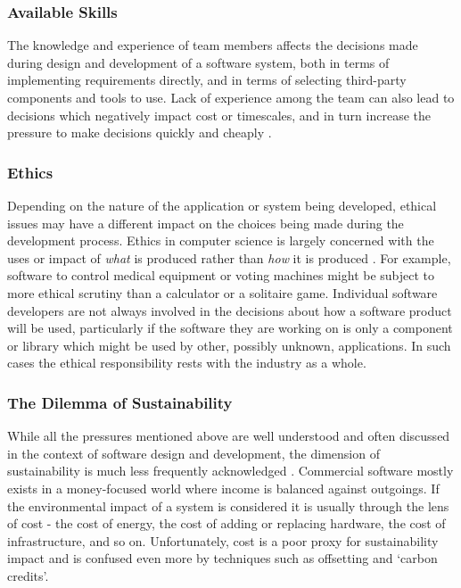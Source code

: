 \subsubsection{Available Skills}

The knowledge and experience of team members affects the decisions made during design and development of a software system, both in terms of implementing requirements directly, and in terms of selecting third-party components and tools to use. Lack of experience among the team can also lead to decisions which negatively impact cost or timescales, and in turn increase the pressure to make decisions quickly and cheaply \citep{Jiang2007a}.

\subsubsection{Ethics}

Depending on the nature of the application or system being developed, ethical issues may have a different impact on the choices being made during the development process. Ethics in computer science is largely concerned with the uses or impact of \emph{what} is produced rather than \emph{how} it is produced \citep{Alidoosti2022}. For example, software to control medical equipment or voting machines \citep{Fleischman2010} might be subject to more ethical scrutiny than a calculator or a solitaire game. Individual software developers are not always involved in the decisions about how a software product will be used, particularly if the software they are working on is only a component or library which might be used by other, possibly unknown, applications. In such cases the ethical responsibility rests with the industry as a whole.

\subsubsection{The Dilemma of Sustainability}

While all the pressures mentioned above are well understood and often discussed in the context of software design and development, the dimension of sustainability is much less frequently acknowledged . Commercial software mostly exists in a money-focused world where income is balanced against outgoings. If the environmental impact of a system is considered it is usually through the lens of cost - the cost of energy, the cost of adding or replacing hardware, the cost of infrastructure, and so on. Unfortunately, cost is a poor proxy for sustainability impact \citep{Barbier1990} and is confused even more by techniques such as offsetting and `carbon credits'.


